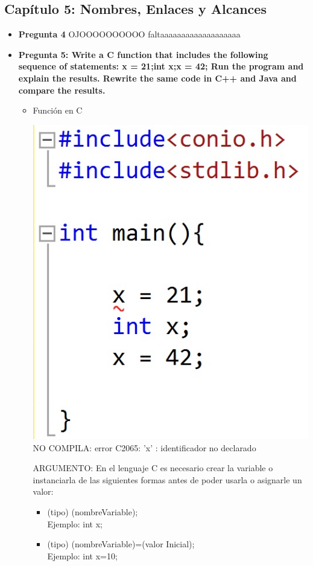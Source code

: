 \documentclass[12pt,oneside]{article}
\begin{document}
		\subsection{Capítulo 5: Nombres, Enlaces y Alcances}
			\begin{itemize}
				\item {\bf Pregunta 4}	
				OJOOOOOOOOOO faltaaaaaaaaaaaaaaaaaaa

				\item {\bf Pregunta 5: Write a C function that includes the following sequence of statements: x = 21;int x;x = 42; Run the program and explain the results. Rewrite the same code in C++ and Java and compare the results.}
					\begin{itemize}
						\item {Función en C}
							\begin{center}
							\includegraphics[scale=0.3]{Imagenes/1.jpg}\\
							NO COMPILA: error C2065: 'x' : identificador no declarado
							\end{center}
							ARGUMENTO: En el lenguaje C es necesario crear la variable o instanciarla de las siguientes formas antes de poder usarla o asignarle un valor: 
							\begin{itemize}
								\item{(tipo) (nombreVariable);}
									\\Ejemplo: int x;
								\item{(tipo) (nombreVariable)=(valor Inicial);}		
									\\Ejemplo: int x=10;							
							\end{itemize}


\end{itemize}
\end{itemize}
\end{document}
